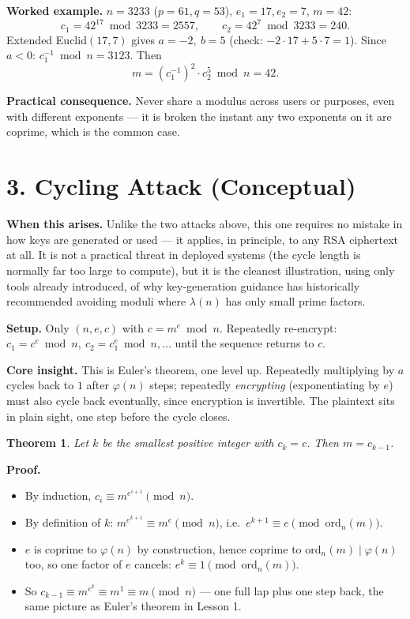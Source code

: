 \documentclass[11pt]{article}
\newtheorem{theorem}{Theorem}
\begin{document}
\textbf{Worked example.} $n=3233$ ($p=61,q=53$), $e_1=17,e_2=7$, $m=42$:
\[
c_1=42^{17}\bmod3233=2557,\qquad c_2=42^{7}\bmod3233=240.
\]
Extended Euclid$(17,7)$ gives $a=-2,\ b=5$ (check: $-2{\cdot}17+5{\cdot}7=1$). Since $a<0$: $c_1^{-1}\bmod n = 3123$. Then
\[
m=(c_1^{-1})^2\cdot c_2^5 \bmod n = 42.
\]

\textbf{Practical consequence.} Never share a modulus across users or purposes, even with different exponents --- it is broken the instant any two exponents on it are coprime, which is the common case.

\hrulefill

\section*{3. Cycling Attack (Conceptual)}

\textbf{When this arises.} Unlike the two attacks above, this one requires no mistake in how keys are generated or used --- it applies, in principle, to any RSA ciphertext at all. It is not a practical threat in deployed systems (the cycle length is normally far too large to compute), but it is the cleanest illustration, using only tools already introduced, of why key-generation guidance has historically recommended avoiding moduli where $\lambda(n)$ has only small prime factors.

\textbf{Setup.} Only $(n,e,c)$ with $c=m^e\bmod n$. Repeatedly re-encrypt: $c_1=c^e\bmod n,\ c_2=c_1^e\bmod n,\dots$ until the sequence returns to $c$.

\textbf{Core insight.} This is Euler's theorem, one level up. Repeatedly multiplying by $a$ cycles back to $1$ after $\varphi(n)$ steps; repeatedly \emph{encrypting} (exponentiating by $e$) must also cycle back eventually, since encryption is invertible. The plaintext sits in plain sight, one step before the cycle closes.

\begin{theorem}
Let $k$ be the smallest positive integer with $c_k=c$. Then $m=c_{k-1}$.
\end{theorem}

\textbf{Proof.}
\begin{itemize}[nosep]
\item By induction, $c_i\equiv m^{e^{i+1}}\pmod n$.
\item By definition of $k$: $m^{e^{k+1}}\equiv m^e\pmod n$, i.e.\ $e^{k+1}\equiv e \pmod{\mathrm{ord}_n(m)}$.
\item $e$ is coprime to $\varphi(n)$ by construction, hence coprime to $\mathrm{ord}_n(m)\mid\varphi(n)$ too, so one factor of $e$ cancels: $e^k\equiv1\pmod{\mathrm{ord}_n(m)}$.
\item So $c_{k-1}\equiv m^{e^k}\equiv m^1\equiv m\pmod n$ --- one full lap plus one step back, the same picture as Euler's theorem in Lesson 1.
\end{itemize}
\end{document}
